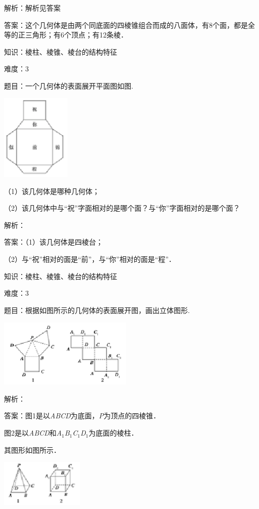 \documentclass{article} %
\begin{document}
解析：解析见答案

答案：这个几何体是由两个同底面的四棱锥组合而成的八面体，有8个面，都是全等的正三角形；有6个顶点；有12条棱．


知识：棱柱、棱锥、棱台的结构特征

难度：3

题目：一个几何体的表面展开平面图如图.

\includegraphics*[width=1.31in, height=1.62in, keepaspectratio=false]{image13}

（1）该几何体是哪种几何体；

（2）该几何体中与``祝''字面相对的是哪个面？与``你''字面相对的是哪个面？

解析：

答案：（1）该几何体是四棱台；

（2）与``祝''相对的面是``前''，与``你''相对的面是``程''．

知识：棱柱、棱锥、棱台的结构特征

难度：3

题目：根据如图所示的几何体的表面展开图，画出立体图形.

\includegraphics*[width=2.52in, height=1.28in, keepaspectratio=false]{image14}

解析：

答案：图1是以\textit{ABCD}为底面，\textit{P}为顶点的四棱锥．

图2是以\textit{ABCD}和\textit{A}${}_{1}$\textit{B}${}_{1}$\textit{C}${}_{1}$\textit{D}${}_{1}$为底面的棱柱．

其图形如图所示．

\includegraphics*[width=1.56in, height=0.88in, keepaspectratio=false]{image15}
\end{document}
